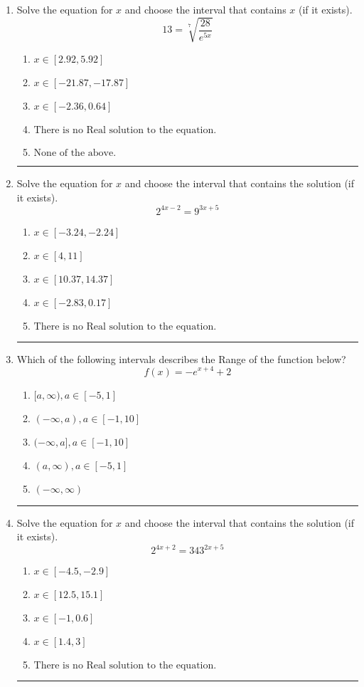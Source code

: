 \documentclass[14pt]{extbook}
\newcommand{\litem}[1]{\item#1\hspace*{-1cm}\rule{\textwidth}{0.4pt}}
\begin{document}
\begin{enumerate}
{\begin{enumerate}[label=\Alph*.]
\end{enumerate} }
\litem{
 Solve the equation for $x$ and choose the interval that contains $x$ (if it exists).\[  13 = \sqrt[7]{\frac{28}{e^{5x}}} \]\begin{enumerate}[label=\Alph*.]
\item \( x \in [2.92, 5.92] \)
\item \( x \in [-21.87, -17.87] \)
\item \( x \in [-2.36, 0.64] \)
\item \( \text{There is no Real solution to the equation.} \)
\item \( \text{None of the above.} \)

\end{enumerate} }
\litem{
Solve the equation for $x$ and choose the interval that contains the solution (if it exists).\[ 2^{4x-2} = 9^{3x+5} \]\begin{enumerate}[label=\Alph*.]
\item \( x \in [-3.24, -2.24] \)
\item \( x \in [4, 11] \)
\item \( x \in [10.37, 14.37] \)
\item \( x \in [-2.83, 0.17] \)
\item \( \text{There is no Real solution to the equation.} \)

\end{enumerate} }
\litem{
Which of the following intervals describes the Range of the function below?\[ f(x) = -e^{x+4}+2 \]\begin{enumerate}[label=\Alph*.]
\item \( [a, \infty), a \in [-5, 1] \)
\item \( (-\infty, a), a \in [-1, 10] \)
\item \( (-\infty, a], a \in [-1, 10] \)
\item \( (a, \infty), a \in [-5, 1] \)
\item \( (-\infty, \infty) \)

\end{enumerate} }
\litem{
Solve the equation for $x$ and choose the interval that contains the solution (if it exists).\[ 2^{4x+2} = 343^{2x+5} \]\begin{enumerate}[label=\Alph*.]
\item \( x \in [-4.5, -2.9] \)
\item \( x \in [12.5, 15.1] \)
\item \( x \in [-1, 0.6] \)
\item \( x \in [1.4, 3] \)
\item \( \text{There is no Real solution to the equation.} \)


\end{enumerate}}
\end{enumerate}
\end{document}
